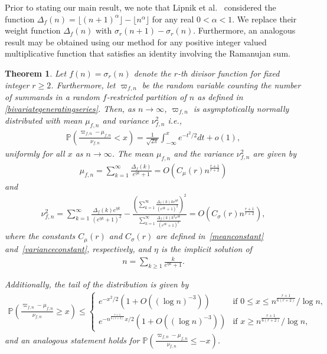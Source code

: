 \documentclass[12pt, oneside,reqno]{amsart}
\numberwithin{equation}{section}
\newtheorem{theorem}{Theorem}[section]
\begin{document}
Prior to stating our main result, we note that Lipnik et al.~\cite{lipniketal} considered the function $\Delta_f(n)=\lfloor{(n+1)^{\alpha}}\rfloor-\lfloor{n^{\alpha}}\rfloor$ for any real $0<\alpha<1$. We replace their weight function $\Delta_f(n)$ with $\sigma_r(n+1)-\sigma_r(n)$. Furthermore, an analogous result may be obtained using our method for any positive integer valued multiplicative function that satisfies an identity involving the Ramanujan sum.


\begin{theorem}\label{cltforsigma}
Let $f(n)=\sigma_r(n)$ denote the $r$-th divisor function for fixed integer $r\geq 2$. Furthermore, let $\varpi_{f,n}$ be the random variable counting the number of summands in a random $f$-restricted partition of $n$ as defined in \eqref{bivariategeneratingseries}. Then, as $n\to\infty$, $\varpi_{f,n}$ is asymptotically normally distributed with mean $\mu_{f,n}$ and variance $\nu^2_{f,n}$ i.e.,
\begin{align*}
\mathbb{P}\left(\frac{\varpi_{f,n}-\mu_{f,n}}{\nu_{f,n}}<x\right)=\frac{1}{\sqrt{2\pi}}\int_{-\infty}^{x}e^{-{t^2}/{2}}dt+o(1),    
\end{align*}
uniformly for all $x$ as $n\to\infty$. The mean $\mu_{f,n}$ and the variance $\nu^2_{f,n}$ are given by
\begin{align}\label{meansigma}
\mu_{f,n}
=\sum_{k=1}^{\infty}\frac{\Delta_f(k)}{e^{\eta k}+1}
=O(C_{\mu}(r)n^{\frac{r+1}{r+2}})
\end{align}
and
\begin{align}\label{variancesigma}
\nu^2_{f,n}
=\sum_{k=1}^{\infty}\frac{\Delta_f(k)e^{\eta k}}{(e^{\eta k}+1)^2}-\frac{\left(\sum_{k=1}^{\infty}\frac{\Delta_f(k)ke^{\eta k}}{(e^{\eta k}+1)^2}\right)^2}{\sum_{k=1}^{\infty}\frac{\Delta_f(k)k^2e^{\eta k}}{(e^{\eta k}+1)^2}} 
=O(C_{\sigma}(r)n^{\frac{r+1}{r+2}}),
\end{align}
where the constants $C_{\mu}(r)$ and $C_{\sigma}(r)$ are defined in~\eqref{meanconstant} and~\eqref{varianceconstant}, respectively, and $\eta$ is the implicit solution of
\begin{align*}
n=\sum_{k\geq 1}\frac{k}{e^{\eta k}+1}.   
\end{align*}

\noindent
Additionally, the tail of the distribution is given by
\begin{align*}
\mathbb{P}\left(\frac{\varpi_{f,n}-\mu_{f,n}}{\nu_{f,n}}\geq x\right)\leq 
\begin{cases}
e^{-x^2/2}\left(1+O((\log n)^{-3})\right) & \text{if $0\leq x\leq n^{\frac{r+1}{6(r+2)}}/\log n$},\\
e^{-n^{\frac{r+1}{6(r+2)}}x/2}\left(1+O((\log n)^{-3})\right) & \text{if $x\geq n^{\frac{r+1}{6(r+2)}}/\log n$},
\end{cases}
\end{align*}
and an analogous statement holds for $\mathbb{P}\left(\frac{\varpi_{f,n}-\mu_{f,n}}{\nu_{f,n}}\leq -x\right)$.
\end{theorem}
\end{document}
